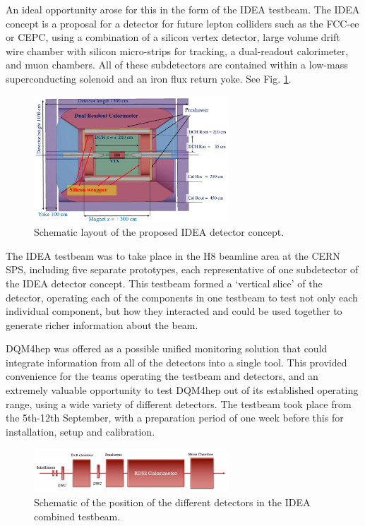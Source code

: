 An ideal opportunity arose for this in the form of the \acrshort{IDEA} testbeam. The \acrfull{IDEA} concept is a proposal for a detector for future lepton colliders such as the \acrshort{FCC}-ee or \acrshort{CEPC}, using a combination of a silicon vertex detector, large volume drift wire chamber with silicon micro-strips for tracking, a dual-readout calorimeter, and muon chambers. All of these subdetectors are contained within a low-mass superconducting solenoid and an iron flux return yoke. See Fig. \ref{figure:idea/detector-concept}.

\begin{figure}[h]
	\centering
	\includegraphics[width=0.65\textwidth]{../Pictures/IDEA/IDEA-concept.png}
	\caption{Schematic layout of the proposed \acrshort{IDEA} detector concept.}
	\label{figure:idea/detector-concept}
\end{figure}

The \acrshort{IDEA} testbeam was to take place in the H8 beamline area at the \acrshort{CERN} \acrshort{SPS}, including five separate prototypes, each representative of one subdetector of the \acrshort{IDEA} detector concept. This testbeam formed a `vertical slice' of the detector, operating each of the components in one testbeam to test not only each individual component, but how they interacted and could be used together to generate richer information about the beam.

\acrshort{DQM4hep} was offered as a possible unified monitoring solution that could integrate information from all of the detectors into a single tool. This provided convenience for the teams operating the testbeam and detectors, and an extremely valuable opportunity to test \acrshort{DQM4hep} out of its established operating range, using a wide variety of different detectors. The testbeam took place from the 5th-12th September, with a preparation period of one week before this for installation, setup and calibration.

\begin{figure}[hp]
	\centering
	\includegraphics[width=0.65\textwidth]{../Pictures/IDEA/IDEA-testbeam-setup.png}
	\caption{Schematic of the position of the different detectors in the \acrshort{IDEA} combined testbeam.}
	\label{figure:idea/testbeam-layout}
\end{figure}

